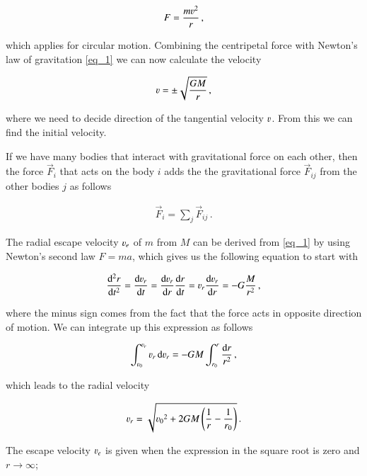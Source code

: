 \documentclass[11pt,english,a4paper]{article}
\begin{document}
\begin{flushleft}
\begin{align*}
F = \frac{m\varv^2}{r} \,,
\end{align*}

which applies for circular motion. Combining the centripetal force with Newton's law of gravitation \eqref{eq_1} we can now calculate the velocity

\begin{align*}
\varv = \pm \sqrt{\frac{GM}{r}} \,,
\end{align*}

where we need to decide direction of the tangential velocity $\varv$. From this we can find the initial velocity. \linebreak

If we have many bodies that interact with gravitational force on each other, then the force $\vec{F}_i$ that acts on the body $i$ adds the the gravitational force $\vec{F}_{ij}$ from the other bodies $j$ as follows

\begin{align*}
\vec{F}_i = \sum_j \vec{F}_{ij}\,.
\end{align*}

The radial escape velocity $\varv_e$ of $m$ from $M$ can be derived from \eqref{eq_1} by using Newton's second law $F=ma$, which gives us the following equation to start with

\begin{align*}
\frac{\mathrm{d}^2 r}{\mathrm{d}t^2} = \frac{\mathrm{d}\varv_r}{\mathrm{d}t} = \frac{\mathrm{d}\varv_r}{\mathrm{d}r}\frac{\mathrm{d}r}{\mathrm{d}t} = \varv_r \frac{\mathrm{d}\varv_r}{\mathrm{d}r} =  - G \frac{M}{r^2} \,,
\end{align*}

where the minus sign comes from the fact that the force acts in opposite direction of motion. We can integrate up this expression as follows

\begin{align*}
\int_{\varv_0}^{\varv_r} \varv_r\,\mathrm{d}\varv_r = - GM \int_{r_0}^r \frac{\mathrm{d}r}{r^2} \,,
\end{align*}

which leads to the radial velocity

\begin{align*}
\varv_r = \sqrt{{\varv_0}^2 + 2GM\p{\frac{1}{r}-\frac{1}{r_0}}}\,.
\end{align*}

The escape velocity $\varv_e$ is given when the expression in the square root is zero and $r\to \infty$;


\end{flushleft}
\end{document}
